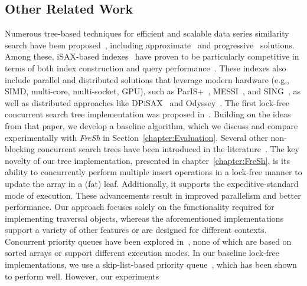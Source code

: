 \documentclass[a4paper,11pt,twoside,openany]{book}
\begin{document}
\subsection{Other Related Work}
Numerous tree-based techniques for efficient and scalable data series similarity search
have been proposed~\cite{DBLP:journals/pvldb/EchihabiZPB18, DBLP:journals/pvldb/EchihabiZPB19,
DBLP:conf/edbt/EchihabiZP21, DBLP:journals/pvldb/EchihabiPZ21},
including approximate~\cite{DBLP:journals/pvldb/AziziEP23, 
DBLP:journals/kais/LevchenkoKYAMPS21} and 
progressive~\cite{DBLP:conf/sigmod/GogolouTEBP20, DBLP:journals/tvcg/JoSF20,
DBLP:conf/sigmod/LiZAH20, DBLP:journals/vldb/EchihabiTGBP23} solutions.
Among these, iSAX-based indexes~\cite{isaxfamily} have proven to be particularly
competitive in terms of both index construction and query performance~\cite{DBLP:journals/pvldb/EchihabiZPB18,
DBLP:journals/pvldb/EchihabiZPB19, hercules, odyssey, dumpy}. These indexes also include
parallel and distributed solutions that leverage modern hardware (e.g., SIMD, multi-core,
multi-socket, GPU), such as ParIS+~\cite{parisplus}, MESSI~\cite{PFP21-I}, and SING~\cite{PFP21-II},
as well as distributed approaches like DPiSAX~\cite{dpisax, dpisaxjournal} and
Odyssey~\cite{odyssey}.
% 
The first lock-free concurrent search tree implementation was proposed in~\cite{EFRB10}.
Building on the ideas from that paper, we develop a baseline algorithm, which we discuss
and compare experimentally with \textit{FreSh} in Section~\ref{chapter:Evaluation}.
Several other non-blocking concurrent search trees have been introduced in the 
literature~\cite{BER14, HL16, ABF20, HJ12, NRM20, CNT14, BP12, EFHR14, FR2018, ABF+22}.
The key novelty of our tree implementation, presented in chapter~\ref{chapter:FreSh}, is its
ability to concurrently perform multiple insert operations in a lock-free manner to
update the array in a (fat) leaf. Additionally, it supports the expeditive-standard mode
of execution. These advancements result in improved parallelism and better performance.
Our approach focuses solely on the functionality required for implementing traversal objects,
whereas the aforementioned implementations support a variety of other features or are designed
for different contexts.
% 
Concurrent priority queues have been explored in~\cite{AK15-I, RT21, WG15, SUNDELL2005609,
tamir_et_al, LJ13}, none of which are based on sorted arrays or support different
execution modes. In our baseline lock-free implementations, we use a skip-list-based
priority queue~\cite{LJ13}, which has been shown to perform well. However, our experiments
\end{document}
